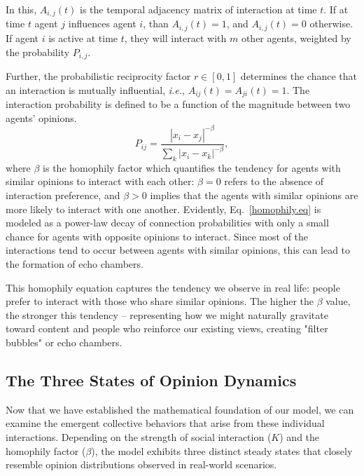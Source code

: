 In this, $A_{i, j}(t)$ is the temporal adjacency matrix of interaction at time $t$. If at time $t$ agent $j$ influences agent $i$, than $A_{i, j}(t) = 1$, and $A_{i, j}(t) = 0$ otherwise. If agent $i$ is active at time $t$, they will interact with $m$ other agents, weighted by the probability $P_{i, j}$. 

Further, the probabilistic reciprocity factor $r \in [0, 1]$ determines the chance that an interaction is mutually influential, {\it i.e.}, $A_{ij}(t)=A_{ji}(t)=1$. The interaction probability is defined to be a function of the magnitude between two agents' opinions.
\begin{equation}
    \label{homophily.eq}
    {P_{ij} = \frac{|x_i - x_j|^{-\beta}}{\sum_k{|x_i - x_k|^{-\beta}}}},
\end{equation}
where $\beta$ is the homophily factor which quantifies the tendency for agents with similar opinions to interact with each other: $\beta = 0$ refers to the absence of interaction preference, and $\beta > 0$ implies that the agents with similar opinions are more likely to interact with one another. Evidently, Eq.~\eqref{homophily.eq} is 
modeled as a power-law decay of connection probabilities with only a small chance for agents with opposite opinions to interact. Since most of the interactions tend to occur between agents with similar opinions, this can lead to the formation of echo chambers.

This homophily equation captures the tendency we observe in real life: people prefer to interact with those who share similar opinions. The higher the $\beta$ value, the stronger this tendency – representing how we might naturally gravitate toward content and people who reinforce our existing views, creating "filter bubbles" or echo chambers.
\subsection{The Three States of Opinion Dynamics}
\label{sec:three_states}
Now that we have established the mathematical foundation of our model, we can examine the emergent collective behaviors that arise from these individual interactions. Depending on the strength of social interaction ($K$) and the homophily factor ($\beta$), the model exhibits three distinct steady states that closely resemble opinion distributions observed in real-world scenarios.

